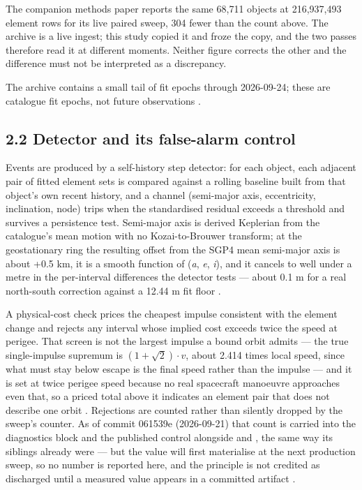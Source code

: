 \documentclass[11pt]{article}
\begin{document}
The companion methods paper reports the same 68,711 objects at 216,937,493 element rows for its live paired sweep, 304 fewer than the count above. The archive is a live ingest; this study copied it and froze the copy, and the two passes therefore read it at different moments. Neither figure corrects the other and the difference must not be interpreted as a discrepancy.

The archive contains a small tail of fit epochs through 2026-09-24; these are catalogue fit epochs, not future observations%
.

\subsection*{2.2 Detector and its false-alarm control}

Events are produced by a self-history step detector: for each object, each adjacent pair of fitted element sets is compared against a rolling baseline built from that object's own recent history, and a channel (semi-major axis, eccentricity, inclination, node) trips when the standardised residual exceeds a threshold and survives a persistence test. Semi-major axis is derived Keplerian from the catalogue's mean motion with no Kozai-to-Brouwer transform; at the geostationary ring the resulting offset from the SGP4 mean semi-major axis is about +0.5 km, it is a smooth function of (\emph{a}, \emph{e}, \emph{i}), and it cancels to well under a metre in the per-interval differences the detector tests --- about 0.1 m for a real north-south correction against a 12.44 m fit floor%
.

A physical-cost check prices the cheapest impulse consistent with the element change and rejects any interval whose implied cost exceeds twice the speed at perigee. That screen is not the largest impulse a bound orbit admits --- the true single-impulse supremum is $(1 + \sqrt{2})\cdot v$, about 2.414 times local speed, since what must stay below escape is the final speed rather than the impulse --- and it is set at twice perigee speed because no real spacecraft manoeuvre approaches even that, so a priced total above it indicates an element pair that does not describe one orbit%
. Rejections are counted rather than silently dropped by the sweep's  counter. As of commit 061539e (2026-09-21) that count is carried into the diagnostics block and the published control alongside  and , the same way its siblings already were --- but the value will first materialise at the next production sweep, so no number is reported here, and the principle is not credited as discharged until a measured value appears in a committed artifact%
.
\end{document}
